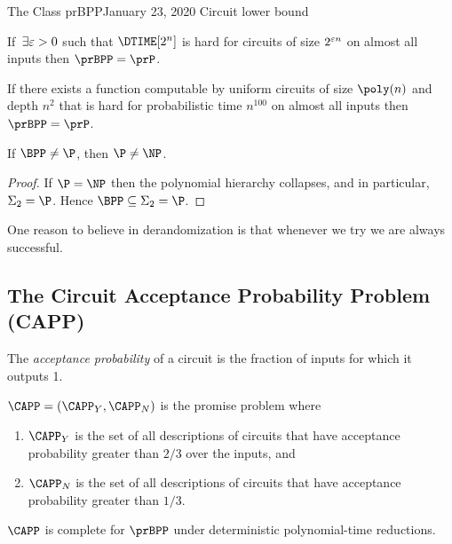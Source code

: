 \begin{lecture}{1}{The Class prBPP}{January 23, 2020}
Circuit lower bound
\begin{proposition}[IW97]
	If $\,\exists \varepsilon>0$ such that $\DTIME[2^n]$ is hard for circuits of size $2^{\varepsilon n}$ on almost all inputs then $\prBPP=\prP$.
\end{proposition}

\begin{proposition}
	If there exists a function computable by uniform circuits of size $\poly(n)$ and depth $n^2$ that is hard for probabilistic time $n^{100}$ on almost all inputs then $\prBPP = \prP$.
\end{proposition}


\begin{proposition}
	If $\BPP \neq \P$, then $\P \neq \NP$.
\end{proposition}
\begin{proof}
  If $\P = \NP$ then the polynomial hierarchy collapses, and in particular,
  $\Sigma_2 = \P$. Hence $\BPP \subseteq \Sigma_2 = \P$.
\end{proof}

One reason to believe in derandomization is that whenever we try we are always
successful. 

\subsection{The Circuit Acceptance Probability Problem (CAPP)}

The \emph{acceptance probability} of a circuit is the fraction of inputs for
which it outputs 1.

\begin{definition}[$\CAPP$]
  $\CAPP = (\CAPP_Y, \CAPP_N)$ is the promise problem where
  \begin{enumerate}
    \item $\CAPP_Y$ is the set of all descriptions of circuits that have
      acceptance probability greater than $2/3$ over the inputs, and
    \item $\CAPP_N$ is the set of all descriptions of circuits that have
      acceptance probability greater than $1/3$.
  \end{enumerate}
\end{definition}

\begin{theorem}\label{thm:complete}
  $\CAPP$ is complete for $\prBPP$ under deterministic polynomial-time reductions.
\end{theorem}


\end{lecture}
